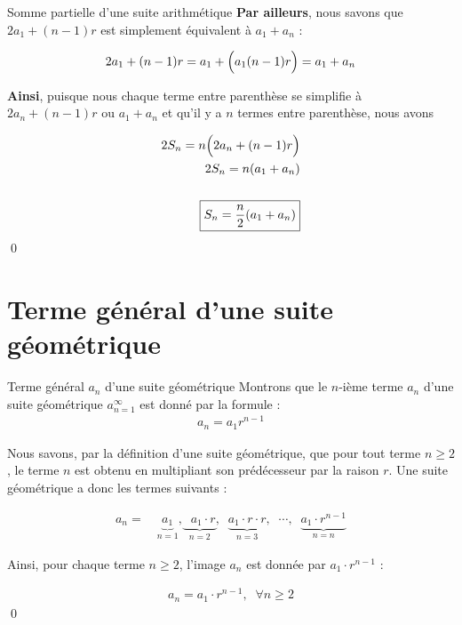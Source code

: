 \documentclass{report}
\begin{document}
\begin{Preuve}{Somme partielle d'une suite arithmétique}{}
        \textbf{Par ailleurs}, nous savons que $2a_1 + (n - 1)r$ est simplement 
        équivalent à $a_1 + a_n$ : 

        \begin{align*}
            2a_1 + (n -1)r = a_1 + \Bigl( a_1 (n - 1)r \Bigr) = a_1 + a_n
        \end{align*}

        \textbf{Ainsi}, puisque nous chaque terme entre parenthèse se simplifie 
        à $2a_n + (n -1)r$ ou $a_1 + a_n$ 
        et qu'il y a $n$ termes entre parenthèse, nous avons 

        \begin{align*}
            2S_n = n\Bigl(2a_n + (n -1)r \Bigr) \\ 
            2S_n = n(a_1 + a_n) \\\\ 
            \boxed{
            S_n = \dfrac{n}{2} (a_1 + a_n)}
        \end{align*}
        \qed
    \end{Preuve}    

    \section{Terme général d'une suite \textcolor{myb}{\textbf{géométrique}}}
    \begin{Preuve}{Terme général $a_n$ d'une suite géométrique}{}
        Montrons que le $n$-ième terme $a_n$ d'une suite géométrique 
        $a_{n = 1}^{\infty}$ est donné par la formule : 
        \begin{align*}
            a_n = a_1r^{n-1}
        \end{align*}

        Nous savons, par la définition d'une suite géométrique, que pour tout terme 
        $n \geq 2$, le terme $n$ est obtenu en multipliant son prédécesseur par la 
        raison $r$. Une suite géométrique a donc les termes suivants : 
        
        \begin{align*}
        a_n = \quad 
        \underbrace{a_1}_{n = 1}, 
        \underbrace{\;\; a_1 \cdot r}_{n = 2}, \;\; 
        \underbrace{a_1 \cdot r \cdot r}_{n = 3}, \;\; 
        \cdots, \;\; 
        \underbrace{a_1 \cdot r^{n-1}}_{n = n}
        \end{align*}

        Ainsi, pour chaque terme $n \geq 2$, l'image $a_n$ est donnée par 
        $a_1 \cdot r^{n -1}$ : 

        \begin{align*}
            \boxed{
            a_n = a_1 \cdot r^{n - 1}, \;\; \forall n \geq 2
        }
        \end{align*} 
        \qed
    \end{Preuve}
\end{document}
